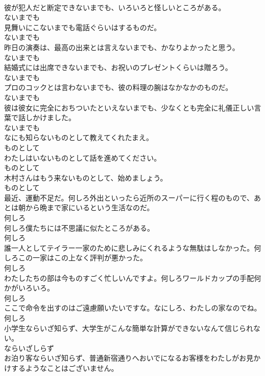 \documentclass[8pt]{extreport}
\begin{document}
\begin{CJK}{UTF8}{min}
\\	彼が犯人だと断定できないまでも、いろいろと怪しいところがある。	
\\	ないまでも	
\\	見舞いにこないまでも電話ぐらいはするものだ。	
\\	ないまでも	
\\	昨日の演奏は、最高の出来とは言えないまでも、かなりよかったと思う。	
\\	ないまでも	
\\	結婚式には出席できないまでも、お祝いのプレゼントくらいは贈ろう。	
\\	ないまでも	
\\	プロのコックとは言わないまでも、彼の料理の腕はなかなかのものだ。	
\\	ないまでも	
\\	彼は彼女に完全におちついたといえないまでも、少なくとも完全に礼儀正しい言葉で話しかけました。	
\\	ないまでも	
\\	なにも知らないものとして教えてくれたまえ。	
\\	ものとして	
\\	わたしはいないものとして話を進めてください。	
\\	ものとして	
\\	木村さんはもう来ないものとして、始めましょう。	
\\	ものとして	
\\	最近、運動不足だ。何しろ外出といったら近所のスーパーに行く程のもので、あとは朝から晩まで家にいるという生活なのだ。	
\\	何しろ	
\\	何しろ僕たちには不思議に似たところがある。	
\\	何しろ	
\\	誰一人としてテイラー一家のために悲しみにくれるような無駄はしなかった。何しろこの一家はこの上なく評判が悪かった。	
\\	何しろ	
\\	わたしたちの部は今ものすごく忙しいんですよ。何しろワールドカップの手配何かがいろいろ。	
\\	何しろ	
\\	ここで命令を出すのはご遠慮願いたいですな。なにしろ、わたしの家なのでね。	
\\	何しろ	
\\	小学生ならいざ知らず、大学生がこんな簡単な計算ができないなんて信じられない。	
\\	ならいざしらず	
\\	お泊り客ならいざ知らず、普通新宿通りへおいでになるお客様をわたしがお見かけするようなことはございません。	

\end{CJK}
\end{document}
